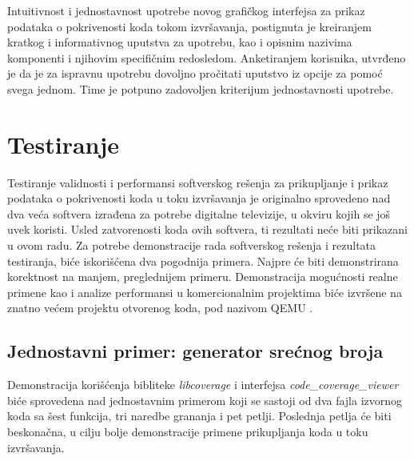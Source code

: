 \documentclass[12pt,oneside]{memoir}
\newcommand{\strano}[1]{\textit{#1}}
\begin{document}
Intuitivnost i jednostavnost upotrebe novog grafičkog interfejsa za prikaz podataka o pokrivenosti koda tokom izvršavanja, postignuta je kreiranjem kratkog i informativnog uputstva za upotrebu, kao i opisnim nazivima komponenti i njihovim specifičnim redosledom. Anketiranjem korisnika, utvrđeno je da je za ispravnu upotrebu dovoljno pročitati uputstvo iz opcije za pomoć svega jednom. Time je potpuno zadovoljen kriterijum jednostavnosti upotrebe. 

\section{Testiranje}

Testiranje validnosti i performansi softverskog rešenja za prikupljanje i prikaz podataka o pokrivenosti koda u toku izvršavanja je originalno sprovedeno nad dva veća softvera izrađena za potrebe digitalne televizije, u okviru kojih se još uvek koristi. Usled zatvorenosti koda ovih softvera, ti rezultati neće biti prikazani u ovom radu. Za potrebe demonstracije rada softverskog rešenja i rezultata testiranja, biće iskorišćena dva pogodnija primera. Najpre će biti demonstrirana korektnost na manjem, preglednijem primeru. Demonstracija mogućnosti realne primene kao i analize performansi u komercionalnim projektima biće izvršene na znatno većem projektu otvorenog koda, pod nazivom QEMU \cite{QEMU}. 

\subsection{Jednostavni primer: generator srećnog broja}
\label{section:lucky}

Demonstracija korišćenja bibliteke \strano{libcoverage} i interfejsa \strano{code\_coverage\_viewer} biće sprovedena nad jednostavnim primerom koji se sastoji od dva fajla izvornog koda sa šest funkcija, tri naredbe grananja i pet petlji. Poslednja petlja će biti beskonačna, u cilju bolje demonstracije primene prikupljanja koda u toku izvršavanja.

\newpage
\end{document}
